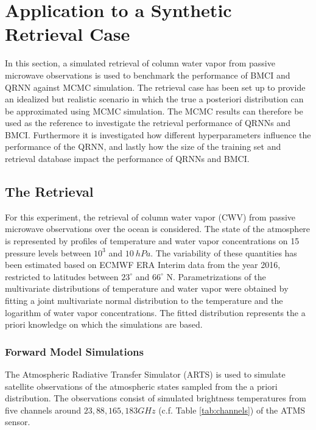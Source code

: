 \documentclass[journal abbreviation, manuscript]{copernicus}
\begin{document}
\section{Application to a Synthetic Retrieval Case}
\label{sec:synthetic}

In this section, a simulated retrieval of column water vapor from passive
microwave observations is used to benchmark the performance of BMCI and QRNN
against MCMC simulation. The retrieval case has been set up to provide an
idealized but realistic scenario in which the true a posteriori distribution can
be approximated using MCMC simulation. The MCMC results can therefore be used as
the reference to investigate the retrieval performance of QRNNs and BMCI. Furthermore
it is investigated how different hyperparameters influence the performance of
the QRNN, and lastly how the size of the training set and retrieval database
impact the performance of QRNNs and BMCI.

\subsection{The Retrieval}

   For this experiment, the retrieval of column water vapor (CWV) from passive
   microwave observations over the ocean is considered. The state of the
   atmosphere is represented by profiles of temperature and water vapor
   concentrations on 15 pressure levels between $10^3$ and $10\:\unit{hPa}$. The
   variability of these quantities has been estimated based on ECMWF ERA
   Interim data \citep{era_interim} from the year 2016, restricted to latitudes
   between $23^\circ$ and $66^\circ$ N. Parametrizations of the multivariate
   distributions of temperature and water vapor were obtained by fitting a joint
   multivariate normal distribution to the temperature and the logarithm of
   water vapor concentrations. The fitted distribution represents the a priori
   knowledge on which the simulations are based.

\subsubsection{Forward Model Simulations}

   The Atmospheric Radiative Transfer Simulator (ARTS) \citep{arts} is used to
   simulate satellite observations of the atmospheric states sampled from the a
   priori distribution. The observations consist of simulated brightness
   temperatures from five channels around $23, 88, 165, 183 \unit{GHz}$
   (c.f. Table \ref{tab:channels}) of the ATMS sensor.
\end{document}
